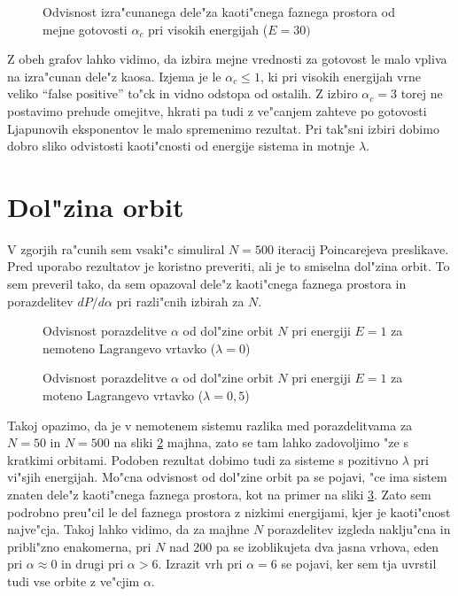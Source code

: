 \documentclass[a4paper,10pt]{article}
\begin{document}
\begin{figure}[H]
 
 \caption{Odvisnost izra"cunanega dele"za kaoti"cnega faznega prostora od mejne gotovosti $\alpha_c$ pri visokih energijah ($E=30)$}
 \label{fig:gotovost-30}
\end{figure}

Z obeh grafov lahko vidimo, da izbira mejne vrednosti za gotovost le malo vpliva na izra"cunan dele"z kaosa. Izjema je le $\alpha_c \leq 1$, ki pri visokih energijah vrne veliko ``false positive'' to"ck in vidno odstopa od ostalih. Z izbiro $\alpha_c = 3$ torej ne postavimo prehude omejitve, hkrati pa tudi z ve"canjem zahteve po gotovosti Ljapunovih eksponentov le malo spremenimo rezultat. Pri tak"sni izbiri dobimo dobro sliko odvistosti kaoti"cnosti od energije sistema in motnje $\lambda$. 

\section{Dol"zina orbit}

V zgorjih ra"cunih sem vsaki"c simuliral $N=500$ iteracij Poincarejeva preslikave. Pred uporabo rezultatov je koristno preveriti, ali je to smiselna dol"zina orbit. To sem preveril tako, da sem opazoval dele"z kaoti"cnega faznega prostora in porazdelitev $dP/d\alpha$ pri razli"cnih izbirah za $N$. 

\begin{figure}[H]
 
 \caption{Odvisnost porazdelitve $\alpha$ od dol"zine orbit $N$ pri energiji $E=1$ za nemoteno Lagrangevo vrtavko ($\lambda=0$)}
 \label{fig:dolzina-brez}
\end{figure}

\begin{figure}[H]
 
 \caption{Odvisnost porazdelitve $\alpha$ od dol"zine orbit $N$ pri energiji $E=1$ za moteno Lagrangevo vrtavko ($\lambda=0,\!5$)}
 \label{fig:dolzina-motnja}
\end{figure}

Takoj opazimo, da je v nemotenem sistemu razlika med porazdelitvama za $N=50$ in $N=500$ na sliki \ref{fig:dolzina-brez} majhna, zato se tam lahko zadovoljimo "ze s kratkimi orbitami. Podoben rezultat dobimo tudi za sisteme s pozitivno $\lambda$ pri vi"sjih energijah. Mo"cna odvisnost od dol"zine orbit pa se pojavi, "ce ima sistem znaten dele"z kaoti"cnega faznega prostora, kot na primer na sliki \ref{fig:dolzina-motnja}. Zato sem podrobno preu"cil le del faznega prostora z nizkimi energijami, kjer je kaoti"cnost najve"cja. Takoj lahko vidimo, da za majhne $N$ porazdelitev izgleda naklju"cna in pribli"zno enakomerna, pri $N$ nad 200 pa se izoblikujeta dva jasna vrhova, eden pri $\alpha \approx 0$ in drugi pri $\alpha > 6$. Izrazit vrh pri $\alpha=6$ se pojavi, ker sem tja uvrstil tudi vse orbite z ve"cjim $\alpha$. 
\end{document}

